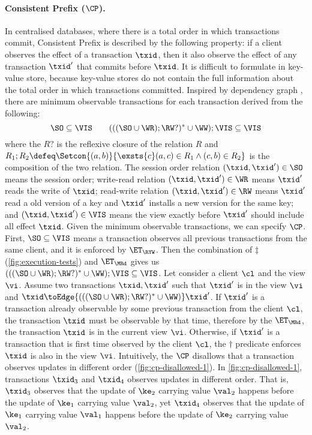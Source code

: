 \paragraph{Consistent Prefix ($\CP$).}
\label{para:cp}
In centralised databases, where there is a total order in which transactions commit, 
Consistent Prefix is described by the following property: 
if a client observes the effect of a transaction $\txid$,
then it also observe the effect of any transaction $\txid'$ that commits before $\txid$.
It is difficult to formulate in key-value store,
because key-value stores do not contain the full information about the total order in which transactions committed. 
Inspired by dependency graph \cite{.....},
there are minimum observable transactions for each transaction derived from the following:
\[
    \SO  \subseteq  \VIS \qquad
    ( ( ( \SO \cup \WR ) ; \RW? )^* \cup \WW ) ; \VIS \subseteq \VIS
\]
where the \( R? \) is the reflexive closure of the relation \( R \) 
and \( R_1 ; R_2 \defeq \Setcon{(a,b)}{\exsts{c} (a,c) \in R_1 \land (c,b) \in R_2 } \) is the composition of the two relation.
The session order relation \( (\txid, \txid') \in \SO \) means the session order;
write-read relation \( (\txid, \txid') \in \WR \) means \( \txid' \) reads the write of \( \txid \);
read-write relation \( (\txid, \txid') \in \RW \) means \( \txid' \) read a old version of a key 
and \( \txid' \) installs a new version for the same key;
and \( (\txid, \txid') \in \VIS \) means the view exactly before \( \txid' \) should include all effect \( \txid \).
Given the minimum observable transactions, we can specify $\CP$. 
First, \( \SO \subseteq \VIS \) means a transaction observes all previous transactions from the same client,
and it is enforced by \( \ET_\RYW \).
Then the combination of \( \ddagger\) (\cref{fig:execution-tests}) and \( \ET_\MRd \) gives us \( ( ( ( \SO \cup \WR ) ; \RW? )^* \cup \WW ) ; \VIS \subseteq \VIS \).
Let consider a client \( \cl \) and the view \( \vi \).
Assume two transactions \( \txid, \txid' \)  such that \( \txid' \) is in the view \( \vi \) and \( \txid \toEdge{( ( ( \SO \cup \WR ) ; \RW? )^* \cup \WW )} \txid' \).
If \( \txid' \) is a transaction already observable by some previous transaction from the client \( \cl \), 
the transaction \( \txid \) must be observable by that time,
therefore by the \( \ET_\MRd \), the transaction \( \txid \) is in the current view \( \vi \).
Otherwise, if \( \txid' \) is a transaction that is first time observed by the client \( \cl \),
the \( \dagger \) predicate enforces \( \txid \) is also in the view \( \vi \).
Intuitively, the \( \CP \) disallows that a transaction observes updates in different order (\cref{fig:cp-disallowed-1}).
In \cref{fig:cp-disallowed-1}, transactions $\txid_{3}$ and \( \txid_4 \) observes updates in different order.
That is, \( \txid_3 \) observes that the update of $\ke_2$ carrying value $\val_2$ happens before the update of $\ke_1$ carrying value $\val_2$,
yet $\txid_{4}$ observes that the update of $\ke_1$ carrying value
$\val_1$ happens before the update of $\ke_2$ carrying value
$\val_2$. 


